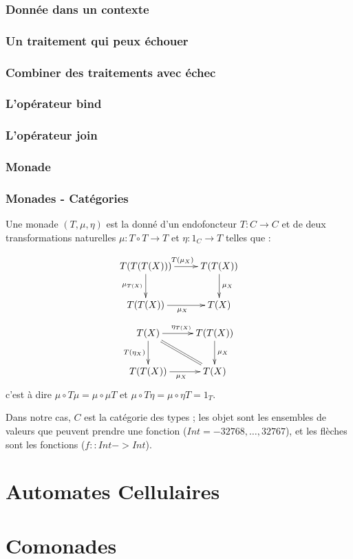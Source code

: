 \documentclass{beamer}
\begin{document}
\begin{frame}
\frametitle{Donnée dans un contexte}
\end{frame}


\begin{frame}
\frametitle{Un traitement qui peux échouer}
\end{frame}

\begin{frame}
\frametitle{Combiner des traitements avec échec}
\end{frame}

\begin{frame}
\frametitle{L'opérateur bind}
\end{frame}


\begin{frame}
\frametitle{L'opérateur join}
\end{frame}

\begin{frame}
\frametitle{Monade}
\end{frame}

\begin{frame}
\frametitle{Monades - Catégories}
Une monade $(T, \mu, \eta)$ est la donné d'un
endofoncteur $T : C \rightarrow C$ et de deux
transformations naturelles $\mu : T\circ T \rightarrow T$ et $\eta : 1_C \rightarrow T$ telles que :

\[
\xymatrix{
T(T(T(X))) \ar[r]^{T(\mu_X)} \ar[d]_{\mu_{T(X)}} & T(T(X)) \ar[d]^{\mu_X} \\
T(T(X)) \ar[r]_{\mu_X} & T(X) \\
}
\]
\[
\xymatrix{
T(X) \ar[r]^{\eta_{T(X)}} \ar[d]_{T(\eta_X)}  \ar@{=}[dr] & T(T(X)) \ar[d]^{\mu_X} \\
T(T(X)) \ar[r]_{\mu_X} & T(X) \\
}
\]
c'est à dire
$\mu \circ T\mu = \mu \circ \mu T$
et
$\mu \circ T \eta = \mu \circ \eta T = 1_T$.

\pause

Dans notre cas, $C$ est la catégorie des types ; les objet sont les ensembles de valeurs que peuvent prendre une fonction ($Int = {-32768 , \dots, 32767}$), et les flèches sont les fonctions ($f :: Int -> Int$).
\end{frame}

\section{Automates Cellulaires}
\begin{frame}
\end{frame}

\section{Comonades}
\begin{frame}
\end{frame}
\end{document}
